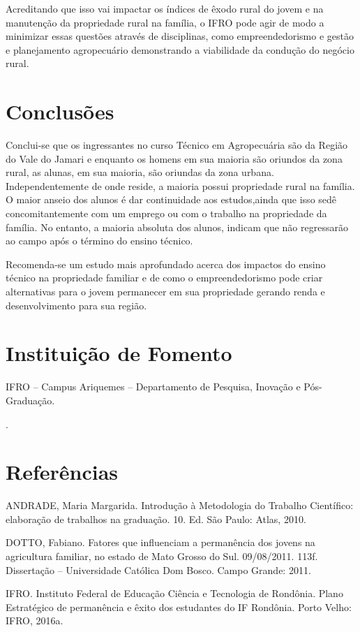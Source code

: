 \documentclass[article,12pt,onesidea,4paper,english,brazil]{abntex2}
\begin{document}
Acreditando que isso vai impactar os índices de êxodo rural do jovem e na manutenção da propriedade rural na família, o IFRO pode agir de modo a minimizar essas questões através de disciplinas, como empreendedorismo e gestão e planejamento agropecuário demonstrando a viabilidade da condução do negócio rural.
	
	\section*{Conclusões}
	
	Conclui-se que os ingressantes no curso Técnico em Agropecuária são da Região do Vale do Jamari e enquanto os homens em sua maioria são oriundos da zona rural, as alunas, em sua maioria, são oriundas da zona urbana. Independentemente de onde reside, a maioria possui propriedade rural na família. O maior anseio dos alunos é dar continuidade aos estudos,ainda que isso sedê concomitantemente com um emprego ou com o trabalho na propriedade da família. No entanto, a maioria absoluta dos alunos, indicam que não regressarão ao campo após o término do ensino técnico.
	
	Recomenda-se um estudo mais aprofundado acerca dos impactos do ensino técnico na propriedade familiar e de como o empreendedorismo pode criar alternativas para o jovem permanecer em sua propriedade gerando renda e desenvolvimento para sua região.
	
	\section*{Instituição de Fomento}
	
	IFRO – Campus Ariquemes – Departamento de Pesquisa, Inovação e Pós- Graduação.
	
	.
	
	\section*{Referências}
	
\noindent ANDRADE, Maria Margarida. Introdução à Metodologia do Trabalho Científico: elaboração de trabalhos na graduação. 10. Ed. São Paulo: Atlas, 2010.


\noindent DOTTO, Fabiano. Fatores que influenciam a permanência dos jovens na agricultura familiar, no estado de Mato Grosso do Sul. 09/08/2011. 113f. Dissertação – Universidade Católica Dom Bosco. Campo Grande: 2011.


\noindent IFRO. Instituto Federal de Educação Ciência e Tecnologia de Rondônia. Plano Estratégico de permanência e êxito dos estudantes do IF Rondônia. Porto Velho: IFRO, 2016a.
\end{document}
